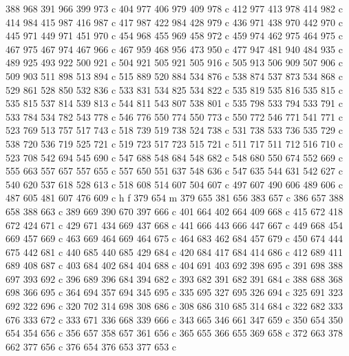 {{        388 968 391 966 399 973 c
        404 977 406 979 409 978 c
        412 977 413 978 414 982 c
        414 984 415 987 416 987 c
        417 987 422 984 428 979 c
        436 971 438 970 442 970 c
        445 971 449 971 451 970 c
        454 968 455 969 458 972 c
        459 974 462 975 464 975 c
        467 975 467 974 467 966 c
        467 959 468 956 473 950 c
        477 947 481 940 484 935 c
        489 925 493 922 500 921 c
        504 921 505 921 505 916 c
        505 913 506 909 507 906 c
        509 903 511 898 513 894 c
        515 889 520 884 534 876 c
        538 874 537 873 534 868 c
        529 861 528 850 532 836 c
        533 831 534 825 534 822 c
        535 819 535 816 535 815 c
        535 815 537 814 539 813 c
        544 811 543 807 538 801 c
        535 798 533 794 533 791 c
        533 784 534 782 543 778 c
        546 776 550 774 550 773 c
        550 772 546 771 541 771 c
        523 769 513 757 517 743 c
        518 739 519 738 524 738 c
        531 738 533 736 535 729 c
        538 720 536 719 525 721 c
        519 723 517 723 515 721 c
        511 717 511 712 516 710 c
        523 708 542 694 545 690 c
        547 688 548 684 548 682 c
        548 680 550 674 552 669 c
        555 663 557 657 557 655 c
        557 650 551 637 548 636 c
        547 635 544 631 542 627 c
        540 620 537 618 528 613 c
        518 608 514 607 504 607 c
        497 607 490 606 489 606 c
        487 605 481 607 476 609 c
        h f
        379 654 m
        379 655 381 656 383 657 c
        386 657 388 658 388 663 c
        389 669 390 670 397 666 c
        401 664 402 664 409 668 c
        415 672 418 672 424 671 c
        429 671 434 669 437 668 c
        441 666 443 666 447 667 c
        449 668 454 669 457 669 c
        463 669 464 669 464 675 c
        464 683 462 684 457 679 c
        450 674 444 675 442 681 c
        440 685 440 685 429 684 c
        420 684 417 684 414 686 c
        412 689 411 689 408 687 c
        403 684 402 684 404 688 c
        404 691 403 692 398 695 c
        391 698 388 697 393 692 c
        396 689 396 684 394 682 c
        393 682 391 682 391 684 c
        388 688 368 698 366 695 c
        364 694 357 694 345 695 c
        335 695 327 695 326 694 c
        325 691 323 692 322 696 c
        320 702 314 698 308 686 c
        308 686 310 685 314 684 c
        322 682 333 676 333 672 c
        333 671 336 668 339 666 c
        343 665 346 661 347 659 c
        350 654 350 654 354 656 c
        356 657 358 657 361 656 c
        365 655 366 655 369 658 c
        372 663 378 662 377 656 c
        376 654 376 653 377 653 c
}}
